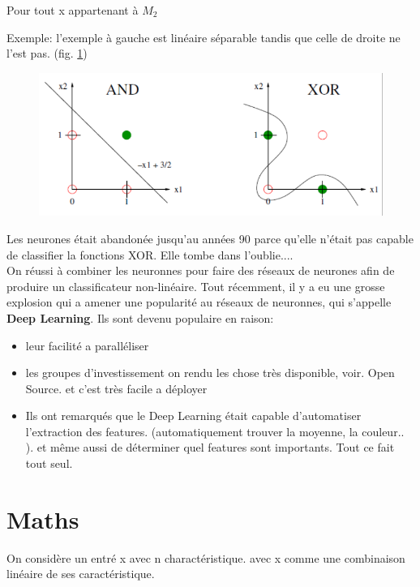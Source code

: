 \documentclass[oneside]{book}
\begin{document}
Pour tout x appartenant à $M_2$

Exemple: l'exemple à gauche est linéaire séparable tandis que celle de droite ne l'est pas. (fig. \ref{fig:lineairement_separable})\\

\begin{figure}[!ht]
\centering
\includegraphics[width= \linewidth]{lineairement_separable.png}
\caption{ }
\label{fig:lineairement_separable}
\end{figure}

Les neurones était abandonée jusqu'au années 90 parce qu'elle n'était pas capable de classifier la fonctions XOR. Elle tombe dans l'oublie.... \\

On réussi à combiner les neuronnes pour faire des réseaux de neurones afin de produire un classificateur non-linéaire. Tout récemment, il y a eu une grosse explosion qui a amener une popularité au réseaux de neuronnes, qui s'appelle \textbf{Deep Learning}. Ils sont devenu populaire en raison:
\begin{itemize}
\item leur facilité a paralléliser
\item les groupes d'investissement on rendu les chose très disponible, voir. Open Source. et c'est très facile a déployer
\item Ils ont remarqués que le Deep Learning était capable d'automatiser l'extraction des features. (automatiquement trouver la moyenne, la couleur.. ). et même aussi de déterminer quel features sont importants. Tout ce fait tout seul. 
\end{itemize}

\section{Maths}
On considère un entré x avec n charactéristique. avec x comme une combinaison linéaire de ses caractéristique.\\
\end{document}
